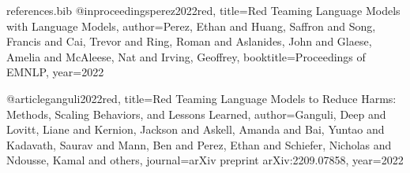 \begin{filecontents*}{references.bib}
@inproceedings{perez2022red,
  title={Red Teaming Language Models with Language Models},
  author={Perez, Ethan and Huang, Saffron and Song, Francis and Cai, Trevor and Ring, Roman and Aslanides, John and Glaese, Amelia and McAleese, Nat and Irving, Geoffrey},
  booktitle={Proceedings of EMNLP},
  year={2022}
}

@article{ganguli2022red,
  title={Red Teaming Language Models to Reduce Harms: Methods, Scaling Behaviors, and Lessons Learned},
  author={Ganguli, Deep and Lovitt, Liane and Kernion, Jackson and Askell, Amanda and Bai, Yuntao and Kadavath, Saurav and Mann, Ben and Perez, Ethan and Schiefer, Nicholas and Ndousse, Kamal and others},
  journal={arXiv preprint arXiv:2209.07858},
  year={2022}
}
\end{filecontents*}

\documentclass[10pt,twocolumn]{article}

\usepackage[letterpaper,margin=0.75in]{geometry}
\usepackage{times}
\usepackage{microtype}
\usepackage[utf8]{inputenc}
\usepackage[T1]{fontenc}

\usepackage{amsmath,amssymb,amsfonts}
\usepackage{graphicx}
\usepackage{booktabs}
\usepackage{multirow}
\usepackage{array}
\usepackage{caption}
\usepackage{subcaption}
\usepackage{xcolor}
\usepackage{enumitem}
\usepackage{algorithm}
\usepackage{algpseudocode}
\usepackage{xcolor}
\usepackage[most]{tcolorbox}


\usepackage[numbers,sort&compress]{natbib}
\usepackage{hyperref}
\hypersetup{
  colorlinks=true,
  linkcolor=blue!50!black,
  citecolor=blue!50!black,
  urlcolor=blue!50!black
}

\setlength{\columnsep}{0.22in}
\setlength{\textfloatsep}{8pt plus 1pt minus 2pt}
\setlength{\floatsep}{6pt plus 1pt minus 2pt}
\setlength{\intextsep}{6pt plus 1pt minus 2pt}
\captionsetup{font=small,labelfont=bf}

\newcommand{\asr}{\mathrm{ASR}}
\newcommand{\orate}{\mathrm{OR}}
\newcommand{\harmbench}{\textsc{HarmBench}}
\newcommand{\xstest}{\textsc{XSTest}}
\newcommand{\pair}{\textsc{PAIR}}
\newcommand{\rloo}{\textsc{RLOO}}
\newcommand{\reinforce}{\textsc{REINFORCE}}
\newcommand{\gepa}{\textsc{GEPA}}
\newcommand{\lp}{\textsc{LP}}
\newcommand{\examplebox}[1]{%
\begin{center}
\fcolorbox{black!35}{black!4}{%
\begin{minipage}{0.94\linewidth}
\small #1
\end{minipage}}
\end{center}
}

